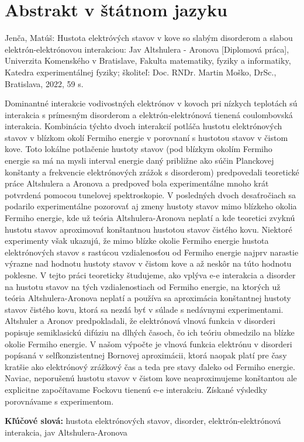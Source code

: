\thispagestyle{empty}
\section*{Abstrakt v štátnom jazyku}

Jenča, Matúš: Hustota elektróvých stavov v kove so slabým disorderom a slabou elektrón-elektrónovou interakciou: Jav Altshulera - Aronova [Diplomová práca], Univerzita Komenského v Bratislave, Fakulta matematiky, fyziky a informatiky, Katedra experimentálnej fyziky; školiteľ: Doc. RNDr. Martin Moško, DrSc., Bratislava, 2022,  59 s.

Dominantné interakcie vodivostných elektrónov v kovoch pri nízkych teplotách sú interakcia s prímesným disorderom a elektrón-elektrónová tienená coulombovská interakcia. 
Kombinácia týchto dvoch interakcií potláča
hustotu elektrónových stavov v blízkom okolí Fermiho
energie v porovnaní s hustotou stavov v čistom kove. Toto lokálne potlačenie hustoty stavov (pod blízkym okolím Fermiho energie sa má na mysli interval energie daný približne ako súčin Planckovej konštanty a frekvencie elektrónových zrážok s disorderom) predpovedali teoretické práce Altshulera a Aronova a predpoveď bola experimentálne mnoho krát potvrdená pomocou tunelovej
spektroskopie. V posledných dvoch desaťročiach sa podarilo experimentálne pozorovať aj zmeny hustoty stavov mimo
blízkeho okolia Fermiho energie, kde už teória Altshulera-Aronova neplatí a kde teoretici zvyknú hustotu stavov aproximovať konštantnou hustotou stavov čistého kovu.
Niektoré experimenty však ukazujú, že mimo blízke okolie Fermiho energie hustota elektrónových stavov s rastúcou vzdialenosťou od Fermiho energie najprv narastie výrazne nad hodnotu hustoty stavov v čistom kove a až neskôr na túto hodnotu poklesne.
V tejto práci teoreticky študujeme, ako vplýva e-e interakcia a disorder na 
hustotu stavov na tých vzdialenostiach od Fermiho energie, na ktorých už teória Altshulera-Aronova neplatí a používa sa aproximácia konštantnej  hustoty stavov čistého kovu, ktorá 
sa nezdá byť v súlade s nedávnymi experimentami. Altshuler a Aronov predpokladali, že elektrónová vlnová funkcia v disorderi popisuje semiklasickú difúziu na dlhých časoch, čo ich teóriu obmedzilo na blízke okolie Fermiho energie. V našom výpočte je vlnová funkcia elektrónu v disorderi popísaná v selfkonzistentnej Bornovej aproximácii, ktorá naopak platí pre časy kratšie ako elektrónový zrážkový čas a teda pre stavy ďaleko od Fermiho energie. Naviac, neporušenú hustotu stavov v čistom kove neaproximujeme konštantou ale explicitne započítavame Fockovu tienenú e-e interakciu. Získané výsledky porovnávame s experimentom.

\begin{flushleft}
\textbf{Kľúčové slová:} hustota elektrónových stavov, disorder, elektrón-elektrónová interakcia,  jav Altshulera-Aronova
\end{flushleft}